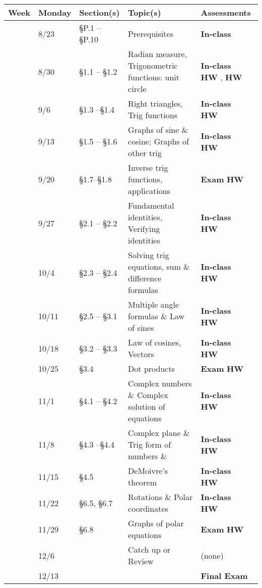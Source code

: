 \documentclass[12pt]{article}
\newcounter{qz}\setcounter{qz}{0}
\newcommand{\qz}{%
\setcounter{qz}{\value{qz}+1}
\textbf{In-class  \theqz} \,}
\newcounter{hw}\setcounter{hw}{0}
\newcommand{\hw}{%
\setcounter{hw}{\value{hw}+1}
\textbf{HW \thehw}}
\newcounter{ex}\setcounter{ex}{0}
\newcommand{\ex}{%
\setcounter{ex}{\value{ex}+1}
Exam \theex}
\newcounter{wk}\setcounter{wk}{0}
\newcommand{\wk}{%
\setcounter{wk}{\value{wk}+1}
\thewk \,\,}
\begin{document}
\begin{center}
    \small
\begin{tabular}  {|l|l|l|l|l|}
\hline
{\bf Week}  & \textbf{Monday} &  {\bf Section(s)} & {\bf Topic(s)} & \textbf{Assessments} \\
\hline \hline 
\wk    & 8/23 &    \S P.1 -- \S P.10   & Prerequisites & \qz  \\
\wk    & 8/30  &  \S1.1 -- \S1.2  &  Radian measure, Trigonometric functions: unit circle  & \qz \hw, \hw  \\
\wk    & 9/6 &     \S1.3 --\S1.4  &   Right triangles, Trig functions  & \qz \hw \\
\wk    & 9/13  &     \S1.5 -- \S1.6  & Graphs of sine \& cosine; Graphs of other trig  & \qz \hw            \\
\wk    & 9/20 &  \S1.7--\S1.8    &  Inverse trig functions, applications    & \textbf{\ex} \hw \\ \hline
\wk    & 9/27   & \S2.1 -- \S2.2   & Fundamental identities,  Verifying identities &  \qz \hw  \\
\wk    & 10/4     & \S2.3 -- \S2.4  &  Solving trig equations, sum \& difference formulas & \qz \hw  \\
\wk   & 10/11   & \S2.5 -- \S3.1  &  Multiple angle formulas \& Law of sines     & \qz \hw  \\
\wk  &  10/18   & \S3.2 -- \S3.3 &  Law of cosines,  Vectors   & \qz  \hw \\ 
\wk &  10/25     &   \S3.4& Dot products  &  \textbf{\ex}  \hw \\ \hline
\wk  & 11/1  &   \S4.1 -- \S4.2 & Complex numbers \&  Complex solution of equations   & \qz  \hw  \\
\wk   & 11/8  & \S4.3 --\S4.4  & Complex plane \&  Trig form of numbers    \&  & \qz \hw \\
\wk   & 11/15& \S4.5  &  DeMoivre's theorem    & \qz \hw  \\
\wk   & 11/22   &  \S6.5, \S6.7     & Rotations \& Polar coordinates & \qz  \hw   \\
\wk   & 11/29    &  \S6.8      &  Graphs of polar equations   & \textbf{\ex} \hw   \\ \hline
\wk   & 12/6      &  & Catch up or Review        & (none) \\  \hline
\wk   & 12/13      &  &     \hfill  & \textbf{ Final Exam}  \\  \hline
   
\end{tabular}
\end{center}
\end{document}
